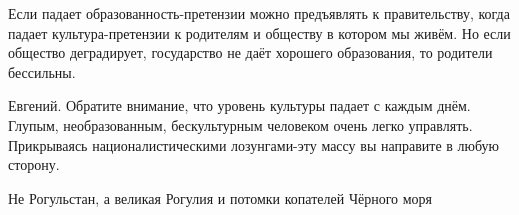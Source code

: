 \begin{itemize}
 

Если падает образованность-претензии можно предъявлять к правительству, когда
падает культура-претензии к родителям и обществу в котором мы живём. Но если
общество деградирует, государство не даёт хорошего образования, то родители
бессильны.


 

Евгений. Обратите внимание, что уровень культуры падает с каждым днём. Глупым,
необразованным, бескультурным человеком очень легко управлять. Прикрываясь
националистическими лозунгами-эту массу вы направите в любую сторону.


 
Не Рогульстан, а великая Рогулия и потомки копателей Чёрного моря 🤣

\end{itemize}

